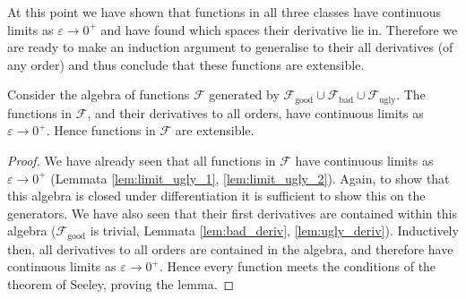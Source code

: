 At this point we have shown that functions in all three classes have continuous limits as $ε \to 0^+$ and have found which spaces their derivative lie in. Therefore we are ready to make an induction argument to generalise to their all derivatives (of any order) and thus conclude that these functions are extensible.

\begin{lem}
Consider the algebra of functions $\mathcal{F}$ generated by $\mathcal{F}_\text{good} \cup \mathcal{F}_\text{bad} \cup \mathcal{F}_{\text{ugly}}$. The functions in $\mathcal{F}$, and their derivatives to all orders, have continuous limits as $ε \to 0^+$. Hence functions in $\mathcal{F}$ are extensible.

\begin{proof}
We have already seen that all functions in $\mathcal{F}$ have continuous limits as $ε \to 0^+$ (Lemmata \ref{lem:limit_ugly_1}, \ref{lem:limit_ugly_2}). Again, to show that this algebra is closed under differentiation it is sufficient to show this on the generators. We have also seen that their first derivatives are contained within this algebra ($\mathcal{F}_\text{good}$ is trivial, Lemmata \ref{lem:bad_deriv}, \ref{lem:ugly_deriv}). Inductively then, all derivatives to all orders are contained in the algebra, and therefore have continuous limits as $ε \to 0^+$. Hence every function meets the conditions of the theorem of Seeley, proving the lemma.
\end{proof}
\end{lem}
